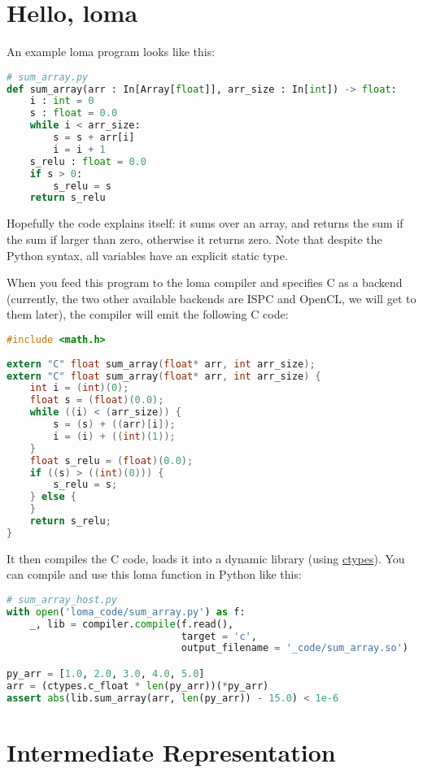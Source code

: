 \section{Hello, loma}

An example loma program looks like this:
\begin{lstlisting}[language=python]
# sum_array.py
def sum_array(arr : In[Array[float]], arr_size : In[int]) -> float:
    i : int = 0
    s : float = 0.0
    while i < arr_size:
        s = s + arr[i]
        i = i + 1
    s_relu : float = 0.0
    if s > 0:
        s_relu = s
    return s_relu
\end{lstlisting}
Hopefully the code explains itself: it sums over an array, and returns the sum if the sum if larger than zero, otherwise it returns zero. Note that despite the Python syntax, all variables have an explicit static type.

When you feed this program to the loma compiler and specifies C as a backend (currently, the two other available backends are ISPC and OpenCL, we will get to them later), the compiler will emit the following C code:
\begin{lstlisting}[language=c]
#include <math.h>
        
extern "C" float sum_array(float* arr, int arr_size);
extern "C" float sum_array(float* arr, int arr_size) {
    int i = (int)(0);
    float s = (float)(0.0);
    while ((i) < (arr_size)) {
        s = (s) + ((arr)[i]);
        i = (i) + ((int)(1));
    }
    float s_relu = (float)(0.0);
    if ((s) > ((int)(0))) {
        s_relu = s;
    } else {
    }
    return s_relu;
}
\end{lstlisting}

It then compiles the C code, loads it into a dynamic library (using \href{https://docs.python.org/3/library/ctypes.html}{ctypes}). You can compile and use this loma function in Python like this:
\begin{lstlisting}[language=python]
# sum_array_host.py
with open('loma_code/sum_array.py') as f:
    _, lib = compiler.compile(f.read(),
                              target = 'c',
                              output_filename = '_code/sum_array.so')

py_arr = [1.0, 2.0, 3.0, 4.0, 5.0]
arr = (ctypes.c_float * len(py_arr))(*py_arr)
assert abs(lib.sum_array(arr, len(py_arr)) - 15.0) < 1e-6
\end{lstlisting}

\section{Intermediate Representation}
\label{sec:IR}

